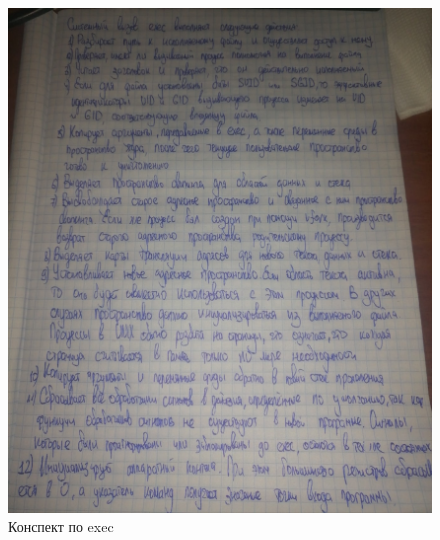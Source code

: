 \FloatBarrier
\begin{figure}[h]
	\begin{center}
		\includegraphics[width = \linewidth]{inc/exec.jpg}
	\end{center}
	\caption{Конспект по exec}
\end{figure}
\FloatBarrier